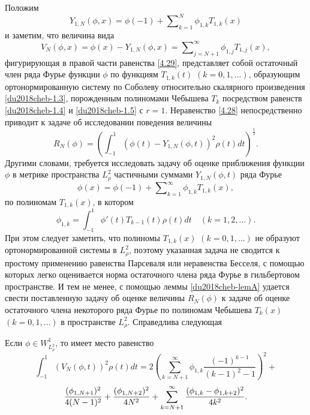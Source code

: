 Положим
\begin{equation}\label{algan-3.30}
  Y_{1,N}(\phi,x)= \phi(-1)+ \sum\nolimits_{k=1}^N  \phi_{1,k}T_{1,k}(x)
\end{equation}
и заметим,  что величина вида
\begin{equation}\label{algan-3.31}
 V_N(\phi,x)=\phi(x)- Y_{1,N}(\phi,x)
=\sum\nolimits_{j=N+1}^\infty  \phi_{1,j}T_{1,j}(x),
\end{equation}
фигурирующая в правой части равенства \eqref{4.29}, представляет собой остаточный член ряда Фурье функции $\phi$ по функциям $T_{1,k}(t)$ $(k=0,1,\ldots)$, образующим ортонормированную систему по Соболеву относительно скалярного произведения \eqref{du2018cheb-1.3}, порожденным  полиномами Чебышева $T_k$ посредством равенств \eqref{du2018cheb-1.4} и \eqref{du2018cheb-1.5} с $r=1$.  Неравенство \eqref{4.28} непосредственно приводит к  задаче об исследовании поведения величины $$R_N(\phi)=\left(\int_{-1}^1(\phi(t)- Y_{1,N}(\phi,t))^2 \rho(t)dt\right)^\frac12.$$
Другими словами, требуется исследовать задачу об оценке приближения функции $\phi$ в метрике пространства $L^2_{\rho}$ частичными суммами $ Y_{1,N}(\phi,t)$  ряда Фурье
$$
\phi(x)= \phi(-1)+ \sum\nolimits_{k=1}^\infty  \phi_{1,k}T_{1,k}(x),
$$
по полиномам $T_{1,k}(x)$, в котором
\begin{equation}\label{algan-3.32}
  \phi_{1,k}=\int_{-1}^1\phi'(t)T_{k-1}(t)\rho(t)dt \quad(k=1,2,\ldots).
\end{equation}
При этом следует заметить, что  полиномы $T_{1,k}(x)$ $(k=0,1,\ldots)$ не образуют ортонормированной системы в $L^2_{\rho}$, поэтому указанная задача не сводится к простому применению равенства Парсеваля или неравенства Бесселя, с помощью которых легко оценивается норма остаточного члена ряда Фурье в гильбертовом пространстве. И тем не менее, с помощью леммы \ref{du2018cheb-lemA} удается свести поставленную задачу об оценке величины $R_N(\phi)$  к задаче об оценке  остаточного члена некоторого  ряда Фурье по полиномам Чебышева $T_{k}(x)$ $(k=0,1,\ldots)$ в пространстве $L^2_{\rho}$. Справедлива следующая
 \begin{lemma}\label{algan-lemB}
 Если $\phi\in W^1_{L^2_{\rho}}$, то имеет место  равенство
 $$
\int_{-1}^{1}(V_N(\phi,t))^2\rho(t)dt=
2\left(\sum_{k=N+1}^{\infty}\phi_{1,k}\frac{(-1)^{k-1}}{(k-1)^2-1}\right)^2+
$$
\begin{equation}\label{algan-3.33}
{(\phi_{1,N+1})^2\over4(N-1)^2} +{(\phi_{1,N+2})^2\over4N^2}
+\sum_{k=N+1}^{\infty}\frac{(\phi_{1,k}-\phi_{1,k+2})^2}{4k^2}.
\end{equation}

 \end{lemma}

